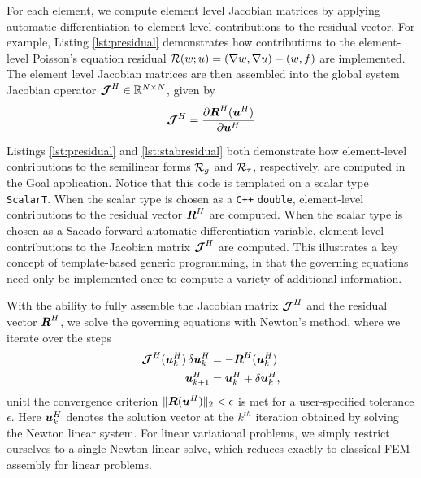 For each element, we compute element level
Jacobian matrices by applying automatic
differentiation \cite{griewank2008evaluating} to element-level contributions
to the residual vector. For example, Listing \ref{lst:presidual} demonstrates
how contributions to the element-level Poisson's equation residual
$\mathcal{R}(w; u) = (\nabla w, \nabla u) - (w, f)$ are implemented. The element level
Jacobian matrices are then assembled into the global system Jacobian operator
$\boldsymbol{\mathcal{J}}^H \in \mathbb{R}^{N \times N}$, given by
%
\begin{gather}
\boldsymbol{\mathcal{J}}^H = \frac{\partial \boldsymbol{R}^H (\boldsymbol{u}^H) }{\partial \boldsymbol{u}^H}
\end{gather}

Listings \ref{lst:presidual} and \ref{lst:stabresidual} both demonstrate how
element-level contributions to the semilinear forms $\mathcal{R}_g$ and $\mathcal{R}_{\tau}$,
respectively, are computed in the Goal application. Notice that this code
is templated on a scalar type \texttt{ScalarT}. When the scalar type is
chosen as a \texttt{C++} \texttt{double}, element-level contributions to
the residual vector $\boldsymbol{R}^H$ are computed. When the scalar type is chosen
as a Sacado forward automatic differentiation variable, element-level
contributions to the Jacobian matrix $\boldsymbol{\mathcal{J}}^H$ are computed. This
illustrates a key concept of template-based generic programming, in that
the governing equations need only be implemented once to compute a variety
of additional information.

With the ability to fully assemble the Jacobian matrix $\boldsymbol{\mathcal{J}}^H$ and the
residual vector $\boldsymbol{R}^H$, we solve the governing equations with Newton's
method, where we iterate over the steps
%
\begin{gather}
\begin{aligned}
\boldsymbol{\mathcal{J}}^H (\boldsymbol{u}^H_k) \, \delta \boldsymbol{u}^H_k &=
- \boldsymbol{R}^H( \boldsymbol{u}^H_k) \\
\boldsymbol{u}^H_{k+1} &= \boldsymbol{u}^H_k + \delta \boldsymbol{u}^H_k,
\end{aligned}
\end{gather}
%
unitl the convergence criterion $\| \boldsymbol{R}(\boldsymbol{u}^H) \|_2 < \epsilon$ is met
for a user-specified tolerance $\epsilon$. Here $\boldsymbol{u}^H_k$ denotes the
solution vector at the $k^{th}$ iteration obtained by solving the Newton
linear system. For linear variational problems, we simply restrict ourselves
to a single Newton linear solve, which reduces exactly to classical FEM
assembly for linear problems.

